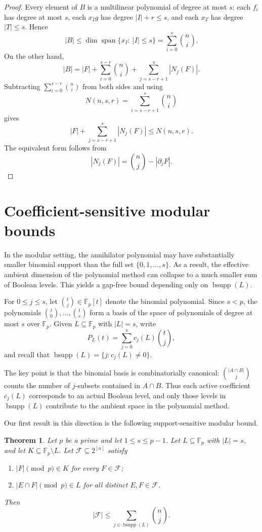 \documentclass[11pt]{article}
\theoremstyle{plain}
\newtheorem{theorem}{Theorem}
\theoremstyle{remark}
\newcommand{\F}{\mathcal{F}}
\newcommand{\abs}[1]{\left|#1\right|}
\newcommand{\bsupp}{\operatorname{bsupp}}
\begin{document}
\begin{proof}
Every element of $B$ is a multilinear polynomial of degree at most $s$: each $f_i$ has degree at
most $s$, each $x_Ig$ has degree $|I|+r\le s$, and each $x_T$ has degree $|T|\le s$. Hence
$$
|B|\le \dim\operatorname{span}\{x_I:\ |I|\le s\}
 =\sum_{i=0}^{s}\binom{n}{i}.
$$
On the other hand,
$$
|B|=|F|+\sum_{i=0}^{s-r}\binom{n}{i}+\sum_{j=s-r+1}^{s}|N_j(F)|.
$$
Subtracting $\sum_{i=0}^{s-r}\binom{n}{i}$ from both sides and using
$$
N(n,s,r)=\sum_{i=s-r+1}^{s}\binom{n}{i}
$$
gives
$$
|F|+\sum_{j=s-r+1}^{s}|N_j(F)|\le N(n,s,r).
$$
The equivalent form follows from
$$
|N_j(F)|=\binom{n}{j}-|\partial_jF|.
$$
\end{proof}

\section{Coefficient-sensitive modular bounds}\label{sec:coeff}


In the modular setting, the annihilator polynomial may have substantially smaller binomial support than the
full set $\{0,1,\dots,s\}$.
As a result, the effective ambient dimension of the polynomial method can collapse to a much smaller sum of
Boolean levels.
This yields a gap-free bound depending only on $\bsupp(L)$.

For $0\le j\le s$, let $\binom{t}{j}\in\mathbb{F}_p[t]$ denote the binomial polynomial.
Since $s<p$, the polynomials $\binom{t}{0},\dots,\binom{t}{s}$ form a basis of the space of polynomials of
degree at most $s$ over $\mathbb{F}_p$.
Given $L\subseteq\mathbb{F}_p$ with $\abs{L}=s$, write
\begin{equation}\label{eq:PL-expand}
  P_L(t)=\sum_{j=0}^{s} c_j(L)\binom{t}{j},
\end{equation}
and recall that $\bsupp(L)=\{j:c_j(L)\neq 0\}$.

The key point is that the binomial basis is combinatorially canonical:
$\binom{\abs{A\cap B}}{j}$ counts the number of $j$-subsets contained in $A\cap B$.
Thus each active coefficient $c_j(L)$ corresponds to an actual Boolean level, and only those levels in
$\bsupp(L)$ contribute to the ambient space in the polynomial method.

Our first result in this direction is the following support-sensitive modular bound.
\begin{theorem}\label{thm:coeffbound}
Let $p$ be a prime and let $1\le s\le p-1$.
Let $L\subseteq \mathbb{F}_p$ with $\abs{L}=s$, and let $K\subseteq \mathbb{F}_p\setminus L$.
Let $\F\subseteq 2^{[n]}$ satisfy
\begin{enumerate}
  \item[(i)] $\abs{F}\pmod p\in K$ for every $F\in\F$;
  \item[(ii)] $\abs{E\cap F}\pmod p\in L$ for all distinct $E,F\in\F$.
\end{enumerate}
Then
$$
  \abs{\F}\le \sum_{j\in \bsupp(L)}\binom{n}{j}.
$$
\end{theorem}
\end{document}

